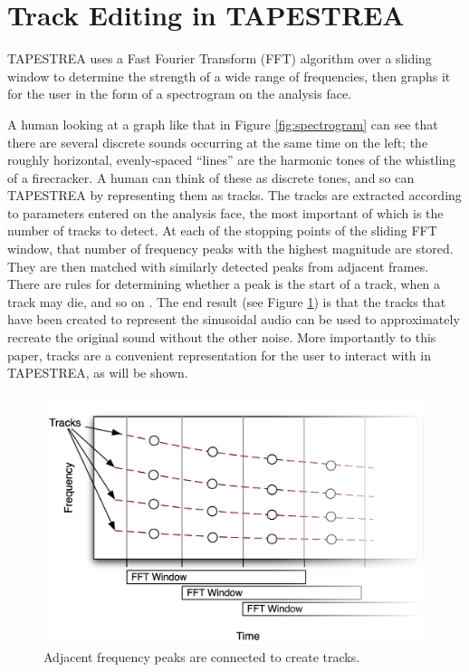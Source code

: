 \documentclass{article}
\begin{document}
\section{Track Editing in TAPESTREA}

TAPESTREA uses a Fast Fourier Transform (FFT) algorithm over a sliding window
to determine the strength of a wide range of frequencies, then graphs it for
the user in the form of a spectrogram on the analysis face.

A human looking at a graph like that in Figure \ref{fig:spectrogram} can see
that there are several discrete sounds occurring at the same time on the left;
the roughly horizontal, evenly-spaced ``lines'' are the harmonic tones of the
whistling of a firecracker.  A human can think of these as discrete tones, and
so can TAPESTREA by representing them as tracks. The tracks are extracted
according to parameters entered on the analysis face, the most important of
which is the number of tracks to detect. At each of the stopping points of the
sliding FFT window, that number of frequency peaks with the highest magnitude
are stored. They are then mat\-ched with similarly detected peaks from adjacent
frames. 
There are rules for
determining whether a peak is the start of a track, when a track may die, and
so on \cite{recompose}. The end result (see Figure \ref{fig:trackdots}) is that
the tracks that have been created to represent the sinusoidal audio can be used
to approximately recreate the original sound without the other noise.  More
importantly to this paper, tracks are a convenient representation for the
user to interact with in TAPESTREA, as will be shown.

\begin{figure}
\includegraphics[scale=0.515]{images/trackdots}
\caption{\label{fig:trackdots}Adjacent frequency peaks are connected to create
tracks.}
\end{figure}
\end{document}
